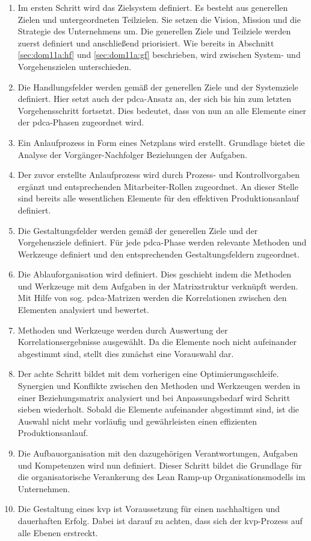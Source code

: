 \begin{enumerate}
 \item Im ersten Schritt wird das Zielsystem definiert. Es besteht aus generellen Zielen und untergeordneten Teilzielen. Sie setzen die Vision, Mission und die Strategie des Unternehmens um. Die generellen Ziele und Teilziele werden zuerst definiert und anschließend priorisiert. Wie bereits in Abschnitt \ref{sec:dom11a:hf} und \ref{sec:dom11a:gf} beschrieben, wird zwischen System- und Vorgehenszielen unterschieden. 
 \item Die Handlungsfelder werden gemäß der generellen Ziele und der Systemziele definiert. Hier setzt auch der \gls{pdca}-Ansatz an, der sich bis hin zum letzten Vorgehensschritt fortsetzt. Dies bedeutet, dass von nun an alle Elemente einer der \gls{pdca}-Phasen zugeordnet wird. 
 \item Ein Anlaufprozess in Form eines Netzplans wird erstellt. Grundlage bietet die Analyse der Vorgänger-Nachfolger Beziehungen der Aufgaben.
 \item  Der zuvor erstellte Anlaufprozess wird durch Prozess- und Kontrollvorgaben ergänzt und entsprechenden Mitarbeiter-Rollen zugeordnet. 
 An dieser Stelle sind bereits alle wesentlichen Elemente für den effektiven Produktionsanlauf definiert. 
 \item Die Gestaltungsfelder werden gemäß der generellen Ziele und der Vorgehensziele definiert. Für jede \gls{pdca}-Phase werden relevante Methoden und Werkzeuge definiert und den entsprechenden Gestaltungsfeldern zugeordnet. 
 \item Die Ablauforganisation wird definiert. Dies geschieht indem die Methoden und Werkzeuge mit dem Aufgaben in der Matrixstruktur verknüpft werden. Mit Hilfe von sog. \gls{pdca}-Matrizen werden die Korrelationen zwischen den Elementen analysiert und bewertet. 
 \item Methoden und Werkzeuge werden durch Auswertung der Korrelationsergebnisse ausgewählt. Da die Elemente noch nicht aufeinander abgestimmt sind, stellt dies zunächst eine Vorauswahl dar. 
 \item Der achte Schritt bildet mit dem vorherigen eine Optimierungsschleife. Synergien und Konflikte zwischen den Methoden und Werkzeugen werden in einer Beziehungsmatrix analysiert und bei Anpassungsbedarf wird Schritt sieben wiederholt. Sobald die Elemente aufeinander abgestimmt sind, ist die Auswahl nicht mehr vorläufig und gewährleisten einen effizienten Produktionsanlauf. 
 \item Die Aufbauorganisation mit den dazugehörigen Verantwortungen, Aufgaben und Kompetenzen %
 wird nun definiert. Dieser Schritt bildet die Grundlage für die organisatorische Verankerung des Lean Ramp-up Organisationsmodells im Unternehmen. 
 \item Die Gestaltung eines \gls{kvp} ist Voraussetzung für einen nachhaltigen und dauerhaften Erfolg. Dabei ist darauf zu achten, dass sich der \gls{kvp}-Prozess auf alle Ebenen erstreckt. 
\end{enumerate}

